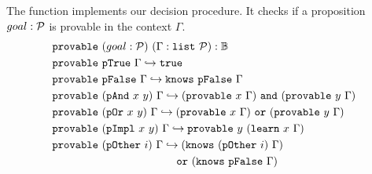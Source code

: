 The function  implements our decision procedure. It checks if a proposition $goal: \cal{P}$ is provable in the context $\Gamma$.
%
\begin{align*}
&\kw{provable}~(goal: \cal{P})~(\hypst): \mathbb{B} \\
&\kw{provable}~\kw{pTrue}~\hyps \re \true \\
&\kw{provable}~\kw{pFalse}~\hyps \re \kw{knows}~\kw{pFalse}~\hyps \\
&\kw{provable}~(\kw{pAnd}~x~y)~\hyps \re (\kw{provable}~x~\hyps)~\kw{and}~(\kw{provable}~y~\hyps) \\
&\kw{provable}~(\kw{pOr}~x~y)~\hyps \re (\kw{provable}~x~\hyps)~\kw{or}~(\kw{provable}~y~\hyps) \\
&\kw{provable}~(\kw{pImpl}~x~y)~\hyps \re \kw{provable}~y~(\kw{learn}~x~\hyps) \\
&\kw{provable}~(\kw{pOther}~i)~\hyps \re (\kw{knows}~(\kw{pOther}~i)~\hyps) \\
&\hspace{11em} ~\kw{or}~ (\kw{knows}~\kw{pFalse}~\hyps)
\end{align*}

